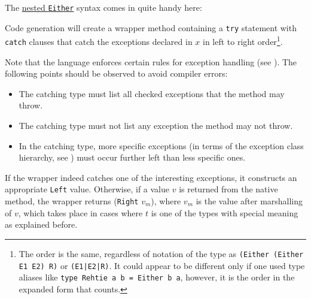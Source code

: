 \begin{description}
The \hyperref[nested-either]{nested \texttt{Either}} syntax comes in quite handy here:


Code generation  will create a wrapper method containing a \texttt{try} statement with \texttt{catch} clauses
that catch the exceptions declared in $x$ in left to right order\footnote{
The order is the same, regardless of notation of the type as \texttt{(Either (Either E1 E2) R)} or \texttt{(E1|E2|R)}.
It could appear to be different only if one used type aliases like \texttt{type Rehtie a b = Either b a}, 
however, it is the order in the expanded form that counts.}.

Note that the \java{} language enforces certain rules for exception handling (see \cite[§11]{langspec3}). The following points should be observed to avoid \java{} compiler errors:

\begin{itemize}
\item The catching type must list all checked exceptions that the method may throw.
\item The catching type must not list any exception the method may not throw.
\item In the catching type, more specific exceptions (in terms of the \java{} exception class hierarchy, see \cite[§11.5]{langspec3})
must occur further left than less specific ones. 
\end{itemize}

If the wrapper indeed catches one of the interesting exceptions, it constructs an appropriate \texttt{Left} value.
Otherwise, if a value $v$ is returned from the native method, the wrapper returns (\texttt{Right} $v_m$), 
where $v_m$ is the value after marshalling of $v$, 
which takes place in cases where $t$ is one of the types with special meaning as explained before.


\end{description}
